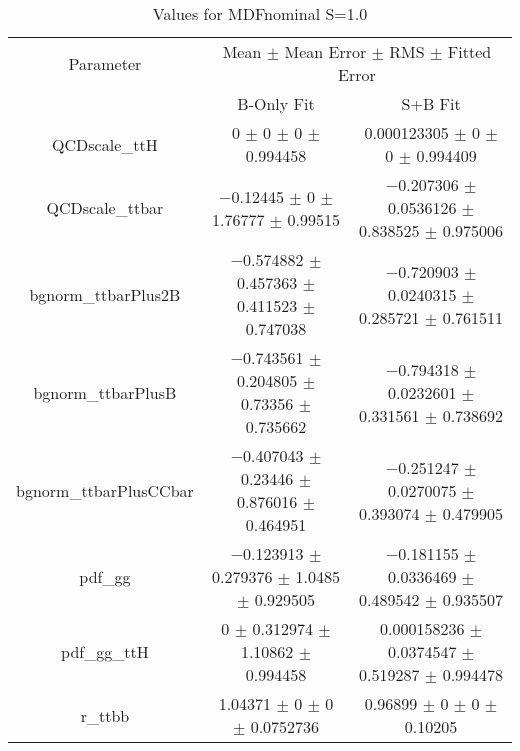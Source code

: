 \begin{table}
\centering
\caption{Values for MDFnominal S=1.0}
\begin{tabular}{ccc}
\toprule
Parameter & \multicolumn{2}{c}{Mean $\pm$ Mean Error $\pm$ RMS $\pm$ Fitted Error}\\
 & B-Only Fit & S+B Fit\\
\midrule
QCDscale\_ttH & \num{0} $\pm$ \num{0} $\pm$ \num{0} $\pm$ \num{0.994458} & \num{0.000123305} $\pm$ \num{0} $\pm$ \num{0} $\pm$ \num{0.994409}\\
QCDscale\_ttbar & \num{-0.12445} $\pm$ \num{0} $\pm$ \num{1.76777} $\pm$ \num{0.99515} & \num{-0.207306} $\pm$ \num{0.0536126} $\pm$ \num{0.838525} $\pm$ \num{0.975006}\\
bgnorm\_ttbarPlus2B & \num{-0.574882} $\pm$ \num{0.457363} $\pm$ \num{0.411523} $\pm$ \num{0.747038} & \num{-0.720903} $\pm$ \num{0.0240315} $\pm$ \num{0.285721} $\pm$ \num{0.761511}\\
bgnorm\_ttbarPlusB & \num{-0.743561} $\pm$ \num{0.204805} $\pm$ \num{0.73356} $\pm$ \num{0.735662} & \num{-0.794318} $\pm$ \num{0.0232601} $\pm$ \num{0.331561} $\pm$ \num{0.738692}\\
bgnorm\_ttbarPlusCCbar & \num{-0.407043} $\pm$ \num{0.23446} $\pm$ \num{0.876016} $\pm$ \num{0.464951} & \num{-0.251247} $\pm$ \num{0.0270075} $\pm$ \num{0.393074} $\pm$ \num{0.479905}\\
pdf\_gg & \num{-0.123913} $\pm$ \num{0.279376} $\pm$ \num{1.0485} $\pm$ \num{0.929505} & \num{-0.181155} $\pm$ \num{0.0336469} $\pm$ \num{0.489542} $\pm$ \num{0.935507}\\
pdf\_gg\_ttH & \num{0} $\pm$ \num{0.312974} $\pm$ \num{1.10862} $\pm$ \num{0.994458} & \num{0.000158236} $\pm$ \num{0.0374547} $\pm$ \num{0.519287} $\pm$ \num{0.994478}\\
r\_ttbb & \num{1.04371} $\pm$ \num{0} $\pm$ \num{0} $\pm$ \num{0.0752736} & \num{0.96899} $\pm$ \num{0} $\pm$ \num{0} $\pm$ \num{0.10205}\\
\bottomrule
\end{tabular}
\end{table}